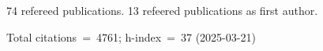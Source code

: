 74 refereed publications. 13 refeered publications as first author.

Total citations~=~4761; h-index~=~37 (2025-03-21)